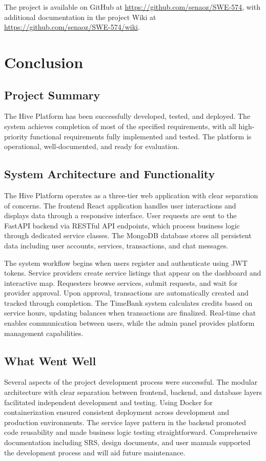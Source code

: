 \documentclass[12pt,a4paper]{report}
\begin{document}
The project is available on GitHub at \url{https://github.com/senaoz/SWE-574}, with additional documentation in the project Wiki at \url{https://github.com/senaoz/SWE-574/wiki}.

\chapter{Conclusion}

\section{Project Summary}

The Hive Platform has been successfully developed, tested, and deployed. The system achieves completion of most of the specified requirements, with all high-priority functional requirements fully implemented and tested. The platform is operational, well-documented, and ready for evaluation.

\section{System Architecture and Functionality}

The Hive Platform operates as a three-tier web application with clear separation of concerns. The frontend React application handles user interactions and displays data through a responsive interface. User requests are sent to the FastAPI backend via RESTful API endpoints, which process business logic through dedicated service classes. The MongoDB database stores all persistent data including user accounts, services, transactions, and chat messages.

The system workflow begins when users register and authenticate using JWT tokens. Service providers create service listings that appear on the dashboard and interactive map. Requesters browse services, submit requests, and wait for provider approval. Upon approval, transactions are automatically created and tracked through completion. The TimeBank system calculates credits based on service hours, updating balances when transactions are finalized. Real-time chat enables communication between users, while the admin panel provides platform management capabilities.

\section{What Went Well}

Several aspects of the project development process were successful. The modular architecture with clear separation between frontend, backend, and database layers facilitated independent development and testing. Using Docker for containerization ensured consistent deployment across development and production environments. The service layer pattern in the backend promoted code reusability and made business logic testing straightforward. Comprehensive documentation including SRS, design documents, and user manuals supported the development process and will aid future maintenance.
\end{document}
